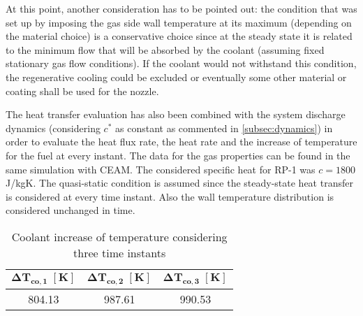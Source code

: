 At this point, another consideration has to be pointed out: the condition that was set up by imposing the gas side wall temperature at its maximum (depending on the material choice) is a conservative choice since at the steady state it is related to the minimum flow that will be absorbed by the coolant (assuming fixed stationary gas flow conditions). If the coolant would not withstand this condition, the regenerative cooling could be excluded or eventually some other material or coating shall be used for the nozzle.

The heat transfer evaluation has also been combined with the system discharge dynamics (considering $c^*$ as constant as commented in \autoref{subsec:dynamics}) in order to evaluate the heat flux rate, the heat rate and the increase of temperature for the fuel at every instant.
The data for the gas properties can be found in the same simulation with CEAM. The considered specific heat for RP-1 was $c = 1800$ J/kgK.
The quasi-static condition is assumed since the steady-state heat transfer is considered at every time instant. Also the wall temperature distribution is considered unchanged in time.

\begin{table}[H]
    \renewcommand{\arraystretch}{1.5}
    \centering
    \begin{tabular}{|c|c|c|}
        \hline
        $\boldsymbol{\Delta T_{co,1} \; [\textbf{K}]}$ & $\boldsymbol{\Delta T_{co,2} \; [\textbf{K}]}$ & $\boldsymbol{\Delta T_{co,3} \; [\textbf{K}]}$ \\
        \hline
        \hline
        804.13 & 987.61 & 990.53 \\
        \hline
    \end{tabular}
    \caption{Coolant increase of temperature considering three time instants}
    \label{table:dt_cooling}
\end{table}


